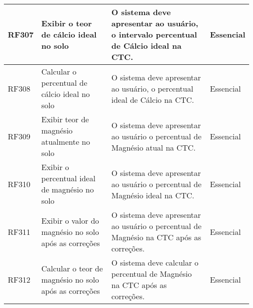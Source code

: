 \begin{longtable}{|p{1.5cm}|p{3cm}|p{7cm}|p{2.5cm}|}
    RF307 & Exibir o teor de cálcio ideal no solo                                            & O sistema deve apresentar ao usuário, o intervalo percentual de Cálcio ideal na CTC.                                                                                                                                                                                                                    & Essencial  \\\hline
    RF308 & Calcular o percentual de cálcio ideal no solo                                    & O sistema deve apresentar ao usuário, o percentual ideal de Cálcio na CTC.                                                                                                                                                                                                                              & Essencial  \\\hline
    RF309 & Exibir teor de magnésio atualmente no solo                                       & O sistema deve apresentar ao usuário o percentual de Magnésio atual na CTC.                                                                                                                                                                                                                             & Essencial  \\\hline
    RF310 & Exibir o percentual ideal de magnésio no solo                                    & O sistema deve apresentar ao usuário o percentual de Magnésio ideal na CTC.                                                                                                                                                                                                                             & Essencial  \\\hline
    RF311 & Exibir o valor do magnésio no solo após as correções                             & O sistema deve apresentar ao usuário o percentual de Magnésio na CTC após as correções.                                                                                                                                                                                                                 & Essencial  \\\hline
    RF312 & Calcular o teor de magnésio no solo após as correções                            & O sistema deve calcular o percentual de Magnésio na CTC após as correções.                                                                                                                                                                                                                              & Essencial  \\\hline

\end{longtable}
